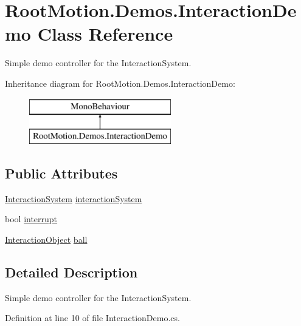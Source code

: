 \hypertarget{class_root_motion_1_1_demos_1_1_interaction_demo}{}\section{Root\+Motion.\+Demos.\+Interaction\+Demo Class Reference}
\label{class_root_motion_1_1_demos_1_1_interaction_demo}


Simple demo controller for the Interaction\+System.  


Inheritance diagram for Root\+Motion.\+Demos.\+Interaction\+Demo\+:\begin{figure}[H]
\begin{center}
\leavevmode
\includegraphics[height=2.000000cm]{class_root_motion_1_1_demos_1_1_interaction_demo}
\end{center}
\end{figure}
\subsection*{Public Attributes}
\begin{DoxyCompactItemize}
\item 
\mbox{\hyperlink{class_root_motion_1_1_final_i_k_1_1_interaction_system}{Interaction\+System}} \mbox{\hyperlink{class_root_motion_1_1_demos_1_1_interaction_demo_ac96e3323915360d8b196811ec76ccc69}{interaction\+System}}
\item 
bool \mbox{\hyperlink{class_root_motion_1_1_demos_1_1_interaction_demo_a823586eede220e51a6d8792fb2068764}{interrupt}}
\item 
\mbox{\hyperlink{class_root_motion_1_1_final_i_k_1_1_interaction_object}{Interaction\+Object}} \mbox{\hyperlink{class_root_motion_1_1_demos_1_1_interaction_demo_a2d7652425b7441c84132bd3a49790087}{ball}}
\end{DoxyCompactItemize}


\subsection{Detailed Description}
Simple demo controller for the Interaction\+System. 



Definition at line 10 of file Interaction\+Demo.\+cs.



